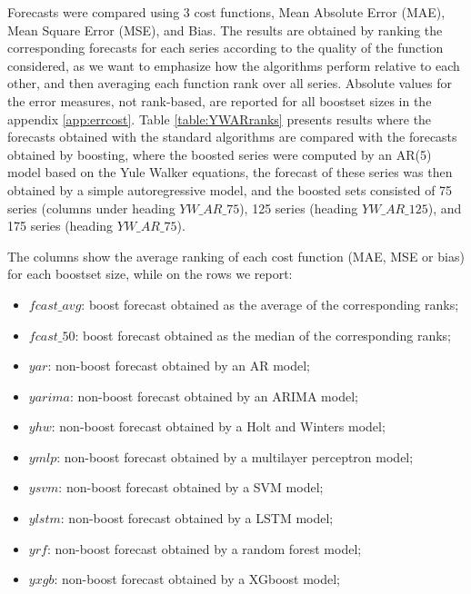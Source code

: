 \documentclass[ijoc,sglanonrev]{informs4}
\begin{document}
Forecasts were compared using 3 cost functions, Mean Absolute Error (MAE), Mean Square Error (MSE), and Bias. The results are obtained by ranking the corresponding forecasts for each series according to the quality of the function considered, as we want to emphasize how the algorithms perform relative to each other, and then averaging each function rank over all series. Absolute values for the error measures, not rank-based, are reported for all boostset sizes in the appendix \ref{app:errcost}. Table \ref{table:YWARranks} presents results where the forecasts obtained with the standard algorithms are compared with the forecasts obtained by boosting, where the boosted series were computed by an AR(5) model based on the Yule Walker equations, the forecast of these series was then obtained by a simple autoregressive model, and the boosted sets consisted of 75 series (columns under heading $YW\_AR\_75$), 125 series (heading $YW\_AR\_125$), and 175 series (heading $YW\_AR\_75$).

The columns show the average ranking of each cost function (MAE, MSE or bias) for each boostset size, while on the rows we report:

\begin{itemize}
  \item $fcast\_avg$: boost forecast obtained as the average of the corresponding ranks;
  \item $fcast\_50$: boost forecast obtained as the median of the corresponding ranks;
  \item $yar$: non-boost forecast obtained by an AR model;
  \item $yarima$: non-boost forecast obtained by an ARIMA model;
  \item $yhw$: non-boost forecast obtained by a Holt and Winters model;
  \item $ymlp$: non-boost forecast obtained by a multilayer perceptron model;
  \item $ysvm$: non-boost forecast obtained by a SVM model;
  \item $ylstm$: non-boost forecast obtained by a LSTM model;
  \item $yrf$: non-boost forecast obtained by a random forest model;
  \item $yxgb$: non-boost forecast obtained by a XGboost model;
\end{itemize}
\end{document}
